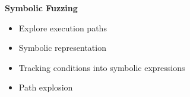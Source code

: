 \begin{frame}
			\textbf{Symbolic Fuzzing}
	        \vspace{1.8mm}
			\small
			\begin{itemize}
				\item Explore execution paths
				\item Symbolic representation
				\item Tracking conditions into symbolic expressions
				\item Path explosion
			\end{itemize}
\end{frame}
